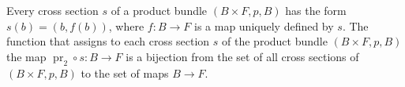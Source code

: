 Every cross section $s$ of a product bundle $(B \times F, p, B)$ has the form $s(b) = (b, f(b))$, where $f: B \rightarrow F$ is a map uniquely defined by $s$. The function that assigns to each cross section $s$ of the product bundle $(B \times F, p, B)$ the map $\operatorname{pr}_2 \circ s: B \rightarrow F$ is a bijection from the set of all cross sections of $(B \times F, p, B)$ to the set of maps $B \rightarrow F$.

